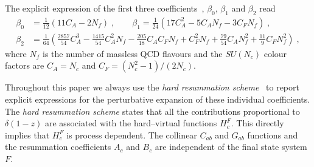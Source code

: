 \documentclass[12pt]{article}
\DeclareRobustCommand{\nn}{\nonumber}
\begin{document}
\begin{appendix}
The explicit expression of the first three coefficients~\cite{Tarasov:1980au,Larin:1993tp}, $\beta_0$, $\beta_1$ and $\beta_2$ read
\begin{align}
  \beta_0 &= 
  \frac{1}{12} \left( 11 C_A - 2 N_f \right) \;,
  \qquad 
  \beta_1 =  
  \frac{1}{24} \left( 17 C_A^2 - 5 C_A N_f - 3 C_F N_f \right) \;,
  \nn\\
  \beta_2 &= 
  \frac{1}{64} \left( \frac{2857}{54} C_A^3
  - \frac{1415}{54} C_A^2 N_f - \frac{205}{18} C_A C_F N_f + C_F^2 N_f
  + \frac{79}{54} C_A N_f^2 + \frac{11}{9} C_F N_f^2 \right) \;,
\end{align}
where $N_f$ is the number of massless QCD flavours and the $SU(N_c)$ colour factors are $C_A=N_c$  and $C_F=(N_c^2-1)/(2N_c)$.

Throughout this paper we always use the \textit{hard resummation scheme}~\cite{Catani:2013tia} to report explicit expressions for the perturbative expansion of these individual coefficients. The \textit{hard resummation scheme} states that all the contributions proportional to $\delta(1-z)$ are associated with the hard--virtual functions $H_c^{F}$. This directly implies that $H_c^{F}$ is process dependent. 
The collinear $C_{ab}$ and $G_{ab}$ functions and the resummation coefficients $A_{c}$ and $B_{c}$ are independent of the final state system $F$. 


\end{appendix}
\end{document}
